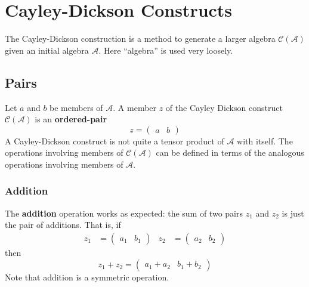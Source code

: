 \chapter{Cayley-Dickson Constructs}
The Cayley-Dickson construction is a method to generate a larger algebra $\mathcal{C}(\mathcal{A})$ given an initial algebra $\mathcal{A}$. Here ``algebra'' is used very loosely.
\section{Pairs}
Let $a$ and $b$ be members of $\mathcal{A}$. A member $z$ of the Cayley Dickson construct $\mathcal{C}(\mathcal{A})$ is an \textbf{ordered-pair}
\begin{equation}
    z = \begin{pmatrix}
        a & b
    \end{pmatrix}
\end{equation}
A Cayley-Dickson construct is not quite a tensor product of $\mathcal{A}$ with itself. The operations involving members of $\mathcal{C}(\mathcal{A})$ can be defined in terms of the analogous operations involving members of $\mathcal{A}$.
\subsection{Addition}
The \textbf{addition} operation works as expected: the sum of two pairs $z_{1}$ and $z_{2}$ is just the pair of additions. That is, if
\begin{align*}
    z_{1} &= \begin{pmatrix}
        a_{1} & b_{1}
    \end{pmatrix} &
    z_{2} &= \begin{pmatrix}
        a_{2} & b_{2}
    \end{pmatrix}
\end{align*}
then
\begin{equation}
    z_{1} + z_{2} = \begin{pmatrix}
        a_{1} + a_{2} & b_{1} + b_{2}
    \end{pmatrix}
\end{equation}
Note that addition is a symmetric operation.
